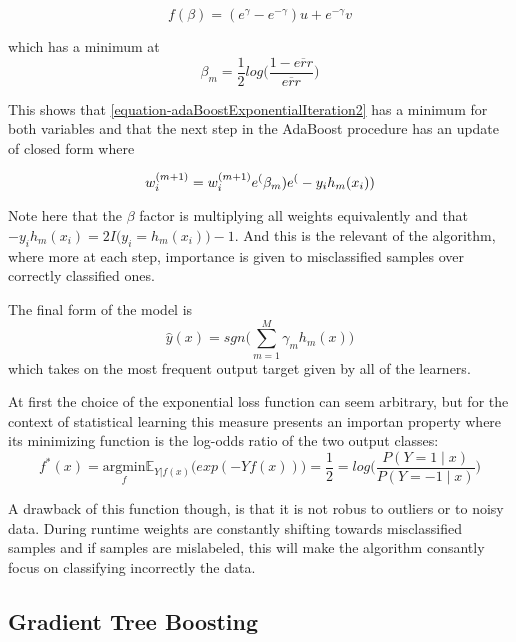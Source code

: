 \documentclass{article}%
\newcommand{\Expect}{{\mathbb{E}}}
\theoremstyle{definition}
\begin{document}
 \begin{equation} \label{equation-adaBoostBetaMinimization}
f(\beta) = ( e^{\gamma} - e^{-\gamma}) u +  e^{-\gamma}v
\end{equation}

which has a minimum at 
\begin{equation}
\beta_{m} = \frac{1}{2} log\big( \frac{1 - \overline{err} }{ \overline{err} }  \big)
\end{equation}

This shows that \ref{equation-adaBoostExponentialIteration2} has a minimum for both variables and that the next step in the AdaBoost procedure has an update of closed form where

\begin{equation}
 w_i^{(m+1)} =   w_i^{(m+1)} e^(\beta_m) e^(-y_i h_m(x_i)) \\
 \end{equation} 
 
Note here that the $\beta$ factor is multiplying all weights equivalently and that $-y_i h_m(x_i) = 2I \big( y_i = h_m(x_i)   \big) -1$. And this is the relevant of the algorithm, where more at each step, importance is given to misclassified samples over correctly classified ones. 

The final form of the model is
$$  \hat{y}(x) = sgn\big(  \sum_{m=1}^{M} \gamma_m h_m(x) \big)$$ which takes on the most frequent output target given by all of the learners.

At first the choice of the exponential loss function can seem arbitrary, but for the context of statistical learning this measure presents an importan property where its minimizing function is the log-odds ratio of the two output classes:
$$f^*(x) = \underset{f}{\mathrm{argmin}} \Expect_{Y | f(x)}\big( exp(-Yf(x))  \big) = \frac{1}{2} =
log\big( \frac{ P(Y=1 \mid x) }{ P(Y=-1 \mid x) }  \big) $$

 A drawback of this function though, is that it is not robus to outliers or to noisy data. During runtime weights are constantly shifting towards misclassified samples and if samples are mislabeled, this will make the algorithm consantly focus on classifying incorrectly the data. 









\subsection{Gradient Tree Boosting}
\end{document}
